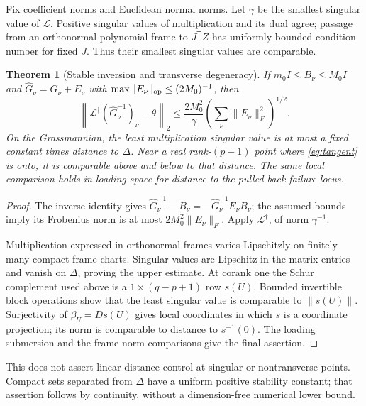 \documentclass[11pt,reqno]{amsart}
\numberwithin{equation}{section}
\newtheorem{theorem}{Theorem}[section]
\theoremstyle{definition}\newtheorem{definition}[theorem]{Definition}
\theoremstyle{remark}\newtheorem{remark}[theorem]{Remark}
\newcommand{\LL}{\mathcal L}
\begin{document}
Fix coefficient norms and Euclidean normal norms. Let $\gamma$ be the smallest singular value of $\LL$. Positive singular values of multiplication and its dual agree; passage from an orthonormal polynomial frame to $J^{\mathsf T}Z$ has uniformly bounded condition number for fixed $J$. Thus their smallest singular values are comparable.
\begin{theorem}[Stable inversion and transverse degeneracy]\label{thm:stability}
If $m_0I\le B_\nu\le M_0I$ and $\widehat G_\nu=G_\nu+E_\nu$ with $\max\|E_\nu\|_{\rm op}\le(2M_0)^{-1}$, then
\begin{equation}\label{eq:stable}
 \left\|\LL^\dagger(\widehat G_\nu^{-1})_\nu-\theta\right\|_2
 \le\frac{2M_0^2}{\gamma}\left(\sum_\nu\|E_\nu\|_F^2\right)^{1/2}.
\end{equation}
On the Grassmannian, the least multiplication singular value is at most a fixed constant times distance to $\Delta$. Near a real rank-$(p-1)$ point where \eqref{eq:tangent} is onto, it is comparable above and below to that distance. The same local comparison holds in loading space for distance to the pulled-back failure locus.
\end{theorem}
\begin{proof}
The inverse identity gives $\widehat G_\nu^{-1}-B_\nu=-\widehat G_\nu^{-1}E_\nu B_\nu$; the assumed bounds imply its Frobenius norm is at most $2M_0^2\|E_\nu\|_F$. Apply $\LL^\dagger$, of norm $\gamma^{-1}$.

Multiplication expressed in orthonormal frames varies Lipschitzly on finitely many compact frame charts. Singular values are Lipschitz in the matrix entries and vanish on $\Delta$, proving the upper estimate. At corank one the Schur complement used above is a $1\times(q-p+1)$ row $s(U)$. Bounded invertible block operations show that the least singular value is comparable to $\|s(U)\|$. Surjectivity of $\beta_U=Ds(U)$ gives local coordinates in which $s$ is a coordinate projection; its norm is comparable to distance to $s^{-1}(0)$. The loading submersion and the frame norm comparisons give the final assertion.
\end{proof}
This does not assert linear distance control at singular or nontransverse points. Compact sets separated from $\Delta$ have a uniform positive stability constant; that assertion follows by continuity, without a dimension-free numerical lower bound.
\end{document}
